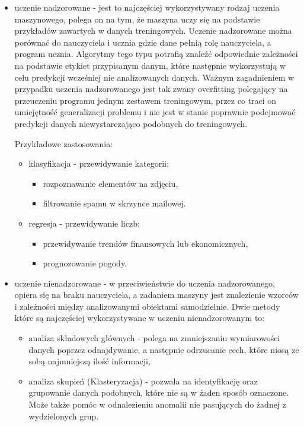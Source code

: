 \begin{itemize}
    \item uczenie nadzorowane -
    jest to najczęściej wykorzystywany rodzaj uczenia maszynowego, polega on na tym,
    że maszyna uczy się na podstawie przykładów zawartych w danych treningowych.
    Uczenie nadzorowane można porównać do nauczyciela i ucznia gdzie dane pełnią rolę nauczyciela, 
    a program ucznia. Algorytmy tego typu potrafią znaleźć odpowiednie zależności na podstawie
    etykiet przypisanym danym,
    które następnie wykorzystują w celu predykcji wcześniej nie analizowanych danych.
    Ważnym zagadnieniem w przypadku uczenia nadzorowanego jest tak zwany overfitting polegający 
    na przeuczeniu programu jednym zestawem treningowym, przez co traci on umiejętność generalizacji problemu
    i nie jest w stanie poprawnie podejmować predykcji danych niewystarczająco podobnych
    do treningowych.

    Przykładowe zastosowania:
    \begin{itemize}
        \item klasyfikacja - przewidywanie kategorii:
        \begin{itemize}
            \item rozpoznawanie elementów na zdjęciu,
            \item filtrowanie spamu w skrzynce mailowej.
        \end{itemize}
        \item regresja - przewidywanie liczb:
        \begin{itemize}
            \item przewidywanie trendów finansowych lub ekonomicznych,
            \item prognozowanie pogody.
        \end{itemize}
    \end{itemize}
    \item uczenie nienadzorowane -
    w przeciwieństwie do uczenia nadzorowanego, opiera się na braku
    nauczyciela, a zadaniem maszyny jest znalezienie wzorców i zależności między analizowanymi
    obiektami samodzielnie. Dwie metody które są najczęściej wykorzystywane w uczeniu nienadzorowanym
    to:
    \begin{itemize}
        \item analiza składowych głównych - polega na zmniejszaniu wymiarowości danych poprzez
        odnajdywanie, a następnie odrzucanie cech, które niosą ze sobą najmniejszą ilość informacji,
        \item analiza skupień (Klasteryzacja) - pozwala na identyfikację oraz grupowanie danych
        podobnych, które nie są w żaden sposób oznaczone. Może także pomóc w odnalezieniu anomalii
        nie pasujących do żadnej z wydzielonych grup.
        

\end{itemize}
\end{itemize}
